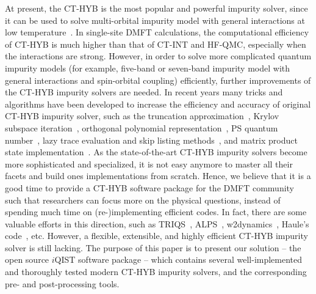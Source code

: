 At present, the CT-HYB is the most popular and powerful impurity solver, since it can be used to solve multi-orbital impurity model with general interactions at low temperature~\cite{RevModPhys.83.349}. In single-site DMFT calculations, the computational efficiency of CT-HYB is much higher than that of CT-INT and HF-QMC, especially when the interactions are  strong. However, in order to solve more complicated quantum impurity models (for example, five-band or seven-band impurity model with general interactions and spin-orbital coupling) efficiently, further improvements of the CT-HYB impurity solvers are needed. In recent years many tricks and algorithms have been developed to increase the efficiency and accuracy of original CT-HYB impurity solver, such as the truncation approximation~\cite{PhysRevB.75.155113}, Krylov subspace iteration~\cite{PhysRevB.80.235117}, orthogonal polynomial representation~\cite{PhysRevB.84.075145,PhysRevB.85.205106}, PS quantum number~\cite{PhysRevB.86.155158}, lazy trace evaluation and skip listing methods~\cite{arXiv:1403.7214}, and matrix product state implementation~\cite{1742-5468-2014-6-P06012}. As the state-of-the-art CT-HYB impurity solvers become more sophisticated and specialized, it is not easy anymore to master all their facets and build ones implementations from scratch. Hence, we believe that it is a good time to provide a CT-HYB software package for the DMFT community such that researchers can focus more on the physical questions, instead of spending much time on (re-)implementing efficient codes. In fact, there are some valuable efforts in this direction, such as TRIQS~\cite{triqs}, ALPS~\cite{1742-5468-2011-05-P05001}, w2dynamics~\cite{w2dynamics}, Haule's code~\cite{haule}, etc. However, a flexible, extensible, and highly efficient CT-HYB impurity solver is still lacking. The purpose of this paper is to present our solution -- the open source $i$QIST software package -- which contains several well-implemented and thoroughly tested modern CT-HYB impurity solvers, and the corresponding pre- and post-processing tools.

